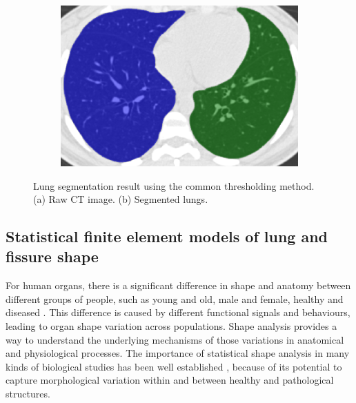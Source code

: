 \begin{figure}[htbp]
\begin{subfigure}{.4\linewidth}
  \includegraphics[width=\linewidth,trim={{.0\wd0} {.0\wd0} {.0\wd0} {.0\wd0}},clip]{Segmentation/Image/LungSegmentationAfter.png}
  \caption{}
  \label{fig:LungSegmentation-b} 
\end{subfigure}
\caption{Lung segmentation result using the common thresholding method. (a) Raw CT image. (b) Segmented lungs.}
\label{fig:LungSegmentation}
\end{figure}

\subsection{Statistical finite element models of lung and fissure shape} \label{ShapeModelGeneration}
For human organs, there is a significant difference in shape and anatomy between different groups of people, such as young and old, male and female, healthy and diseased \citep{krumpe1985aging, crapo1993aging}. This difference is caused by different functional signals and behaviours, leading to organ shape variation across populations. Shape analysis provides a way to understand the underlying mechanisms of those variations in anatomical and physiological processes. The importance of statistical shape analysis in many kinds of biological studies has been well established \citep{dryden1998statistical,stegmann2002brief,styner2003statistical,heimann2009statistical}, because of its potential to capture morphological variation within and between healthy and pathological structures.

